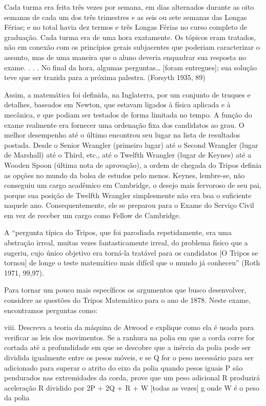 \documentclass[12pt]{article}
\begin{document}
Cada turma era feita três vezes por semana, em dias alternados durante as oito semanas de cada um dos três trimestres e as seis ou sete semanas das Longas Férias; e no total havia dez termos e três Longas Férias no curso completo de graduação. Cada turma era de uma hora exatamente. Os tópicos eram tratados, não em conexão com os princípios gerais subjacentes que poderiam caracterizar o assunto, mas de uma maneira que o aluno deveria enquadrar sua resposta no exame. . . . No final da hora, algumas perguntas… [foram entregues]; sua solução teve que ser trazida para a próxima palestra. (Forsyth 1935, 89)

Assim, a matemática foi definida, na Inglaterra, por um conjunto de truques e detalhes, baseados em Newton, que estavam ligados à física aplicada e à mecânica, e que podiam ser testados de forma limitada no tempo. A função do exame realmente era fornecer uma ordenação fixa dos candidatos ao grau. O melhor desempenho até o último encontrou seu lugar na lista de resultados postada. Desde o Senior Wrangler (primeiro lugar) até o Second Wrangler (lugar de Marshall) até o Third, etc., até o Twelfth Wrangler (lugar de Keynes) até a Wooden Spoon (última nota de aprovação), a ordem de chegada do Tripos definia as opções no mundo da bolsa de estudos pelo menos. Keynes, lembre-se, não conseguiu um cargo acadêmico em Cambridge, o desejo mais fervoroso de seu pai, porque sua posição de Twelfth Wrangler simplesmente não era boa o suficiente naquele ano. Consequentemente, ele se preparou para o Exame do Serviço Civil em vez de receber um cargo como Fellow de Cambridge.

A “pergunta típica do Tripos, que foi parodiada repetidamente, era uma abstração irreal, muitas vezes fantasticamente irreal, do problema físico que a sugeriu, cujo único objetivo era torná-la tratável para os candidatos [O Tripos se tornou] de longe o teste matemático mais difícil que o mundo já conheceu” (Roth 1971, 99,97).

Para tornar um pouco mais específicos os argumentos que busco desenvolver, considere as questões do Tripos Matemático para o ano de 1878. Neste exame, encontramos perguntas como:

viii. Descreva a teoria da máquina de Atwood e explique como ela é usada para verificar as leis dos movimentos. Se a ranhura na polia em que a corda corre for cortada até a profundidade em que se descobre que a inércia da polia pode ser dividida igualmente entre os pesos móveis, e se Q for o peso necessário para ser adicionado para superar o atrito do eixo da polia quando pesos iguais P são pendurados nas extremidades da corda, prove que um peso adicional R produzirá aceleração R dividido por 2P + 2Q + R + W [todas as vezes] g onde W é o peso da polia
\end{document}
